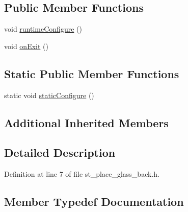\subsection*{Public Member Functions}
\begin{DoxyCompactItemize}
\item 
void \hyperlink{structsm__fetch__two__table__whiskey__pour_1_1StPlaceGlassBack_a8a0fa1b8c421f4a9d208531c71dde335}{runtime\+Configure} ()
\item 
void \hyperlink{structsm__fetch__two__table__whiskey__pour_1_1StPlaceGlassBack_a3099df2f411da5ec5d92f98f41fdaa5f}{on\+Exit} ()
\end{DoxyCompactItemize}
\subsection*{Static Public Member Functions}
\begin{DoxyCompactItemize}
\item 
static void \hyperlink{structsm__fetch__two__table__whiskey__pour_1_1StPlaceGlassBack_ae9bd64e9ec60d3430b8f29a2793a2634}{static\+Configure} ()
\end{DoxyCompactItemize}
\subsection*{Additional Inherited Members}


\subsection{Detailed Description}


Definition at line 7 of file st\+\_\+place\+\_\+glass\+\_\+back.\+h.



\subsection{Member Typedef Documentation}
\mbox{\label{structsm__fetch__two__table__whiskey__pour_1_1StPlaceGlassBack_a213af1569b47b18d2a7c531a2de73375}} 
